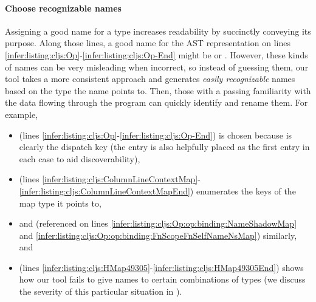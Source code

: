 \paragraph{Choose recognizable names}
Assigning a good name for a type increases
readability by succinctly conveying its purpose.
Along those lines, a good name for the AST representation
on lines \ref{infer:listing:cljs:Op}-\ref{infer:listing:cljs:Op-End}
might be  or .
However, these kinds of names can be very misleading when incorrect, so
instead of guessing them,
our tool takes a more consistent approach and generates \emph{easily recognizable}
names based on the type the name points to.
Then, those with a passing familiarity with the data flowing through the program
can quickly identify and rename them.
For example,
\begin{itemize}
  \item
     (lines \ref{infer:listing:cljs:Op}-\ref{infer:listing:cljs:Op-End})
    is chosen because  is
    clearly the dispatch key (the  entry is also helpfully placed
    as the first entry in each case to aid discoverability),
  \item
     (lines \ref{infer:listing:cljs:ColumnLineContextMap}-\ref{infer:listing:cljs:ColumnLineContextMapEnd})
    enumerates the keys of the map type it points to,
  \item
     and  (referenced on lines
    \ref{infer:listing:cljs:Op:op:binding:NameShadowMap} and \ref{infer:listing:cljs:Op:op:binding:FnScopeFnSelfNameNsMap})
    similarly, and
  \item
     (lines \ref{infer:listing:cljs:HMap49305}-\ref{infer:listing:cljs:HMap49305End})
    shows how our tool fails to give names to certain combinations
    of types (we discuss the severity of this particular situation in
    ).
\end{itemize}

